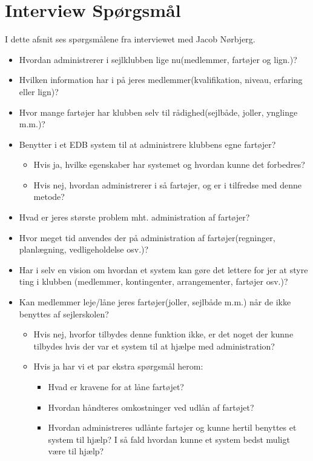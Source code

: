 \chapter{Interview Spørgsmål} \label{questions}
I dette afsnit ses spørgsmålene fra interviewet med Jacob Nørbjerg.

\begin{itemize}
\item Hvordan administrerer i sejlklubben lige nu(medlemmer, fartøjer og lign.)?
\item Hvilken information har i på jeres medlemmer(kvalifikation, niveau, erfaring eller lign)?
\item Hvor mange fartøjer har klubben selv til rådighed(sejlbåde, joller, ynglinge m.m.)?
\item Benytter i et EDB system til at administrere klubbens egne fartøjer?
	\begin{itemize}
	\item Hvis ja, hvilke egenskaber har systemet og hvordan kunne det forbedres?
	\item Hvis nej, hvordan administrerer i så fartøjer, og er i tilfredse med denne metode?
	\end{itemize}
\item Hvad er jeres største problem mht. administration af fartøjer?
\item Hvor meget tid anvendes der på administration af fartøjer(regninger, planlægning, vedligeholdelse osv.)?
\item Har i selv en vision om hvordan et system kan gøre det lettere for jer at styre ting i klubben (medlemmer, kontingenter, arrangementer, fartøjer osv.)?
\item Kan medlemmer leje/låne jeres fartøjer(joller, sejlbåde m.m.) når de ikke benyttes af sejlerskolen?
	\begin{itemize}
	\item Hvis nej, hvorfor tilbydes denne funktion ikke, er det noget der kunne tilbydes hvis der var et system til at hjælpe med administration?
	\item Hvis ja har vi et par ekstra spørgsmål herom:
		\begin{itemize}
		\item Hvad er kravene for at låne fartøjet?
		\item Hvordan håndteres omkostninger ved udlån af fartøjet?
		\item Hvordan administreres udlånte fartøjer og kunne hertil benyttes et system til hjælp? I så fald hvordan kunne et system bedst muligt være til hjælp?
		\end{itemize}
	\end{itemize}
\end{itemize}
